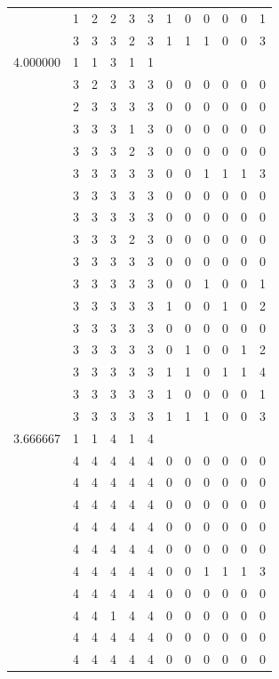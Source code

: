 \documentclass[]{book}
\theoremstyle{definition}
\theoremstyle{definition}
\theoremstyle{definition}
\theoremstyle{remark}
\begin{document}
\begin{table}
{\begin{tabular}[t]{rrrrrrrrrrrr}
 & 1 & 2 & 2 & 3 & 3 & 1 & 0 & 0 & 0 & 0 & 1\\
 & 3 & 3 & 3 & 2 & 3 & 1 & 1 & 1 & 0 & 0 & 3\\
4.000000 & 1 & 1 & 3 & 1 & 1 &  &  &  &  &  & \\
 & 3 & 2 & 3 & 3 & 3 & 0 & 0 & 0 & 0 & 0 & 0\\
 & 2 & 3 & 3 & 3 & 3 & 0 & 0 & 0 & 0 & 0 & 0\\
 & 3 & 3 & 3 & 1 & 3 & 0 & 0 & 0 & 0 & 0 & 0\\
 & 3 & 3 & 3 & 2 & 3 & 0 & 0 & 0 & 0 & 0 & 0\\
 & 3 & 3 & 3 & 3 & 3 & 0 & 0 & 1 & 1 & 1 & 3\\
 & 3 & 3 & 3 & 3 & 3 & 0 & 0 & 0 & 0 & 0 & 0\\
 & 3 & 3 & 3 & 3 & 3 & 0 & 0 & 0 & 0 & 0 & 0\\
 & 3 & 3 & 3 & 2 & 3 & 0 & 0 & 0 & 0 & 0 & 0\\
 & 3 & 3 & 3 & 3 & 3 & 0 & 0 & 0 & 0 & 0 & 0\\
 & 3 & 3 & 3 & 3 & 3 & 0 & 0 & 1 & 0 & 0 & 1\\
 & 3 & 3 & 3 & 3 & 3 & 1 & 0 & 0 & 1 & 0 & 2\\
 & 3 & 3 & 3 & 3 & 3 & 0 & 0 & 0 & 0 & 0 & 0\\
 & 3 & 3 & 3 & 3 & 3 & 0 & 1 & 0 & 0 & 1 & 2\\
 & 3 & 3 & 3 & 3 & 3 & 1 & 1 & 0 & 1 & 1 & 4\\
 & 3 & 3 & 3 & 3 & 3 & 1 & 0 & 0 & 0 & 0 & 1\\
 & 3 & 3 & 3 & 3 & 3 & 1 & 1 & 1 & 0 & 0 & 3\\
3.666667 & 1 & 1 & 4 & 1 & 4 &  &  &  &  &  & \\
 & 4 & 4 & 4 & 4 & 4 & 0 & 0 & 0 & 0 & 0 & 0\\
 & 4 & 4 & 4 & 4 & 4 & 0 & 0 & 0 & 0 & 0 & 0\\
 & 4 & 4 & 4 & 4 & 4 & 0 & 0 & 0 & 0 & 0 & 0\\
 & 4 & 4 & 4 & 4 & 4 & 0 & 0 & 0 & 0 & 0 & 0\\
 & 4 & 4 & 4 & 4 & 4 & 0 & 0 & 0 & 0 & 0 & 0\\
 & 4 & 4 & 4 & 4 & 4 & 0 & 0 & 1 & 1 & 1 & 3\\
 & 4 & 4 & 4 & 4 & 4 & 0 & 0 & 0 & 0 & 0 & 0\\
 & 4 & 4 & 1 & 4 & 4 & 0 & 0 & 0 & 0 & 0 & 0\\
 & 4 & 4 & 4 & 4 & 4 & 0 & 0 & 0 & 0 & 0 & 0\\
 & 4 & 4 & 4 & 4 & 4 & 0 & 0 & 0 & 0 & 0 & 0\\

\end{tabular}}
\end{table}
\end{document}
